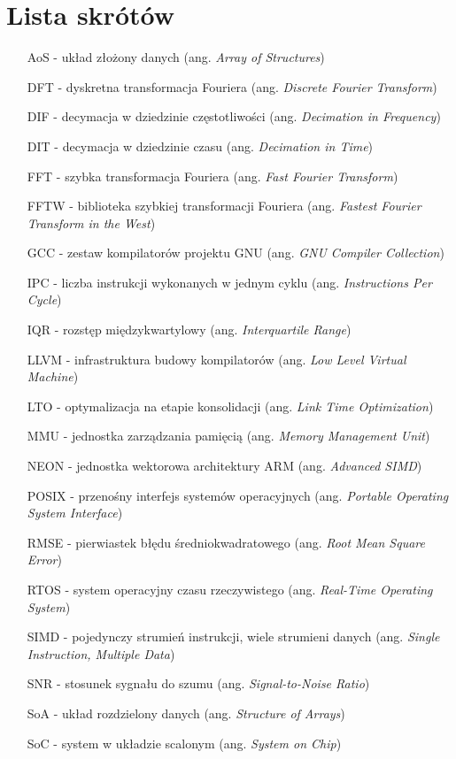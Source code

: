 \chapter*{Lista skrótów}

\begin{itemize}[noitemsep,topsep=0pt,parsep=0pt,partopsep=0pt,labelwidth=2cm,leftmargin=2.3cm,align=left,itemindent=0pt]
\item[AoS] - układ złożony danych (ang. \textit{Array of Structures})
\item[DFT] - dyskretna transformacja Fouriera (ang. \textit{Discrete Fourier Transform})
\item[DIF] - decymacja w dziedzinie częstotliwości (ang. \textit{Decimation in Frequency})
\item[DIT] - decymacja w dziedzinie czasu (ang. \textit{Decimation in Time})
\item[FFT] - szybka transformacja Fouriera (ang. \textit{Fast Fourier Transform})
\item[FFTW] - biblioteka szybkiej transformacji Fouriera (ang. \textit{Fastest Fourier Transform in the West})
\item[GCC] - zestaw kompilatorów projektu GNU (ang. \textit{GNU Compiler Collection})
\item[IPC] - liczba instrukcji wykonanych w jednym cyklu (ang. \textit{Instructions Per Cycle})
\item[IQR] - rozstęp międzykwartylowy (ang. \textit{Interquartile Range})
\item[LLVM] - infrastruktura budowy kompilatorów (ang. \textit{Low Level Virtual Machine})
\item[LTO] - optymalizacja na etapie konsolidacji (ang. \textit{Link Time Optimization})
\item[MMU] - jednostka zarządzania pamięcią (ang. \textit{Memory Management Unit})
\item[NEON] - jednostka wektorowa architektury ARM (ang. \textit{Advanced SIMD})
\item[POSIX] - przenośny interfejs systemów operacyjnych (ang. \textit{Portable Operating System Interface})
\item[RMSE] - pierwiastek błędu średniokwadratowego (ang. \textit{Root Mean Square Error})
\item[RTOS] - system operacyjny czasu rzeczywistego (ang. \textit{Real-Time Operating System})
\item[SIMD] - pojedynczy strumień instrukcji, wiele strumieni danych (ang. \textit{Single Instruction, Multiple Data})
\item[SNR] - stosunek sygnału do szumu (ang. \textit{Signal-to-Noise Ratio})
\item[SoA] - układ rozdzielony danych (ang. \textit{Structure of Arrays})
\item[SoC] - system w układzie scalonym (ang. \textit{System on Chip})
\end{itemize}
